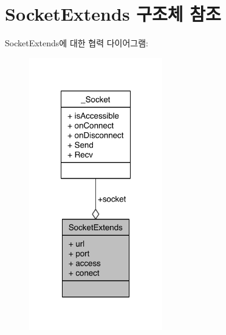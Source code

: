\hypertarget{struct_socket_extends}{\section{Socket\-Extends 구조체 참조}
\label{struct_socket_extends}
}


Socket\-Extends에 대한 협력 다이어그램\-:\nopagebreak
\begin{figure}[H]
\begin{center}
\leavevmode
\includegraphics[width=164pt]{struct_socket_extends__coll__graph}
\end{center}
\end{figure}

